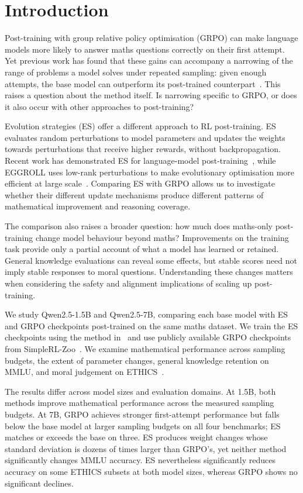 \documentclass[10pt]{article}
\begin{document}
\section{Introduction}
Post-training with group relative policy optimisation (GRPO) can make language models more likely to answer maths questions correctly on their first attempt. Yet previous work has found that these gains can accompany a narrowing of the range of problems a model solves under repeated sampling: given enough attempts, the base model can outperform its post-trained counterpart~\cite{yue}. This raises a question about the method itself. Is narrowing specific to GRPO, or does it also occur with other approaches to post-training?

Evolution strategies (ES) offer a different approach to RL post-training. ES evaluates random perturbations to model parameters and updates the weights towards perturbations that receive higher rewards, without backpropagation. Recent work has demonstrated ES for language-model post-training~\cite{qiu}, while EGGROLL uses low-rank perturbations to make evolutionary optimisation more efficient at large scale~\cite{sarkar}. Comparing ES with GRPO allows us to investigate whether their different update mechanisms produce different patterns of mathematical improvement and reasoning coverage.

The comparison also raises a broader question: how much does maths-only post-training change model behaviour beyond maths? Improvements on the training task provide only a partial account of what a model has learned or retained. General knowledge evaluations can reveal some effects, but stable scores need not imply stable responses to moral questions. Understanding these changes matters when considering the safety and alignment implications of scaling up post-training.

We study Qwen2.5-1.5B and Qwen2.5-7B, comparing each base model with ES and GRPO checkpoints post-trained on the same maths dataset. We train the ES checkpoints using the method in~\cite{qiu} and use publicly available GRPO checkpoints from SimpleRL-Zoo~\cite{simplerl}. We examine mathematical performance across sampling budgets, the extent of parameter changes, general knowledge retention on MMLU, and moral judgement on ETHICS~\cite{ethics}.

The results differ across model sizes and evaluation domains. At 1.5B, both methods improve mathematical performance across the measured sampling budgets. At 7B, GRPO achieves stronger first-attempt performance but falls below the base model at larger sampling budgets on all four benchmarks; ES matches or exceeds the base on three. ES produces weight changes whose standard deviation is dozens of times larger than GRPO's, yet neither method significantly changes MMLU accuracy. ES nevertheless significantly reduces accuracy on some ETHICS subsets at both model sizes, whereas GRPO shows no significant declines.
\end{document}
